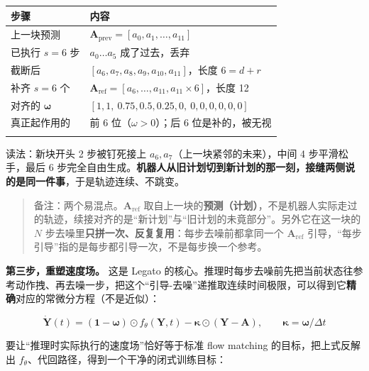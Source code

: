 \documentclass[
  chinese,
]{ctexart}
\begin{document}
\begin{center}
\begin{tabular}{@{}>{\raggedright\arraybackslash}p{} >{\raggedright\arraybackslash}p{}@{}}
\toprule\noalign{}
步骤 & 内容 \\
\midrule\noalign{}
上一块预测 & \(\mathbf{A}_{\mathrm{prev}} = [a_0, a_1, \dots, a_{11}]\) \\
已执行 \(s=6\) 步 & \(a_0 \dots a_5\) 成了过去，丢弃 \\
截断后 & \([a_6, a_7, a_8, a_9, a_{10}, a_{11}]\)，长度 \(6 = d + r\) \\
补齐 \(s=6\) 个 & \(\mathbf{A}_{\mathrm{ref}} = [a_6, \dots, a_{11}, a_{11} \times 6]\)，长度 12 \\
对齐的 \(\boldsymbol{\omega}\) & \([1, 1,\ 0.75, 0.5, 0.25, 0,\ 0,0,0,0,0,0]\) \\
真正起作用的 & 前 6 位（\(\omega > 0\)）；后 6 位是补的，被无视 \\
\bottomrule\noalign{}
\end{tabular}
\end{center}

读法：新块开头 2 步被钉死接上 \(a_6, a_7\)（上一块紧邻的未来），中间 4
步平滑松手，最后 6
步完全自由生成。\textbf{机器人从旧计划切到新计划的那一刻，接缝两侧说的是同一件事}，于是轨迹连续、不跳变。

\begin{quote}
备注：两个易混点。\(\mathbf{A}_{\mathrm{ref}}\)
取自上一块的\textbf{预测（计划）}，不是机器人实际走过的轨迹，续接对齐的是``新计划''与``旧计划的未竟部分''。另外它在这一块的
\(N\) 步去噪里\textbf{只拼一次、反复复用}：每步去噪前都拿同一个
\(\mathbf{A}_{\mathrm{ref}}\)
引导，``每步引导''指的是每步都引导一次，不是每步换一个参考。
\end{quote}

\textbf{第三步，重塑速度场。} 这是 Legato
的核心。推理时每步去噪前先把当前状态往参考动作拽、再去噪一步，把这个``引导-去噪''递推取连续时间极限，可以得到它\textbf{精确}对应的常微分方程（不是近似）：

\[\dot{\mathbf{Y}}(t) = (\mathbf{1} - \boldsymbol{\omega}) \odot f_\theta(\mathbf{Y}, t) - \boldsymbol{\kappa} \odot (\mathbf{Y} - \mathbf{A}), \qquad \boldsymbol{\kappa} = \boldsymbol{\omega} / \Delta t\]

要让``推理时实际执行的速度场''恰好等于标准 flow matching
的目标，把上式反解出
\(f_\theta\)、代回路径，得到一个干净的闭式训练目标：
\end{document}
